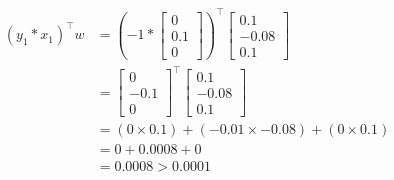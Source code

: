 \documentclass{article}
\begin{document}
\begin{titlepage}
\begin{align*} 
(y_1*x_1)^\top w &= \left(-1*\begin{bmatrix}
0\\
0.1\\
0
\end{bmatrix}\right)^\top\begin{bmatrix}
0.1\\
-0.08\\
0.1
\end{bmatrix} \\
&= \begin{bmatrix}
0\\
-0.1\\
0
\end{bmatrix}^\top\begin{bmatrix}
0.1\\
-0.08\\
0.1
\end{bmatrix}\\
&= (0 \times 0.1) + (-0.01 \times -0.08) + (0 \times 0.1) \\
&= 0 + 0.0008 + 0 \\
&= 0.0008 > 0.0001
\end{align*}


\end{titlepage}
\end{document}
